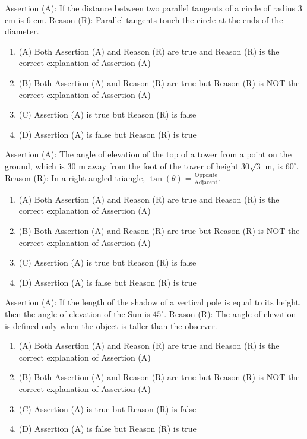 \documentclass[12pt,a4paper]{exam}
\begin{document}
\begin{questions}
\question[1] Assertion (A): If the distance between two parallel tangents of a circle of radius $3$ cm is $6$ cm. Reason (R): Parallel tangents touch the circle at the ends of the diameter.
\begin{enumerate}[label=(\Alph*)]
  \item (A) Both Assertion (A) and Reason (R) are true and Reason (R) is the correct explanation of Assertion (A)
  \item (B) Both Assertion (A) and Reason (R) are true but Reason (R) is NOT the correct explanation of Assertion (A)
  \item (C) Assertion (A) is true but Reason (R) is false
  \item (D) Assertion (A) is false but Reason (R) is true
\end{enumerate}
\vspace{0.15cm}

\question[1] Assertion (A): The angle of elevation of the top of a tower from a point on the ground, which is $30 \text{ m}$ away from the foot of the tower of height $30 \sqrt{3} \text{ m}$, is $60^\circ$. 
Reason (R): In a right-angled triangle, $\tan(\theta) = \frac{\text{Opposite}}{\text{Adjacent}}$.
\begin{enumerate}[label=(\Alph*)]
  \item (A) Both Assertion (A) and Reason (R) are true and Reason (R) is the correct explanation of Assertion (A)
  \item (B) Both Assertion (A) and Reason (R) are true but Reason (R) is NOT the correct explanation of Assertion (A)
  \item (C) Assertion (A) is true but Reason (R) is false
  \item (D) Assertion (A) is false but Reason (R) is true
\end{enumerate}
\vspace{0.15cm}

\question[1] Assertion (A): If the length of the shadow of a vertical pole is equal to its height, then the angle of elevation of the Sun is $45^\circ$. 
Reason (R): The angle of elevation is defined only when the object is taller than the observer.
\begin{enumerate}[label=(\Alph*)]
  \item (A) Both Assertion (A) and Reason (R) are true and Reason (R) is the correct explanation of Assertion (A)
  \item (B) Both Assertion (A) and Reason (R) are true but Reason (R) is NOT the correct explanation of Assertion (A)
  \item (C) Assertion (A) is true but Reason (R) is false
  \item (D) Assertion (A) is false but Reason (R) is true
\end{enumerate}
\vspace{0.15cm}


\end{questions}
\end{document}
